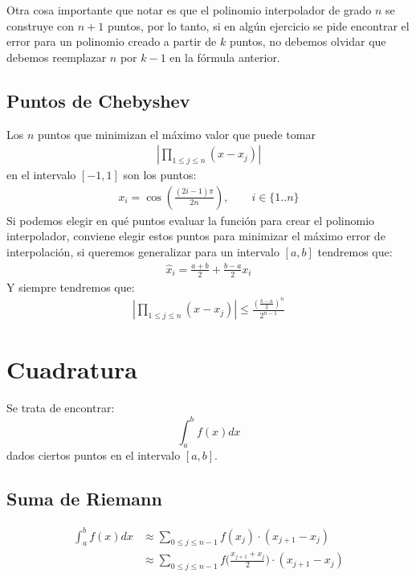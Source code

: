 \documentclass[spanish, fleqn]{article}
\begin{document}
Otra cosa importante que notar es que el polinomio interpolador de grado $n$ se construye con $n+1$ puntos, por lo tanto, si en algún ejercicio se pide encontrar el error para un polinomio creado a partir de $k$ puntos, no debemos olvidar que debemos reemplazar $n$ por $k-1$ en la fórmula anterior.

\subsection{Puntos de Chebyshev}
Los $n$ puntos que minimizan el máximo valor que puede tomar
\begin{align*}
\left| \prod_{1 \leqslant j \leqslant n} (x-x_j) \right|
\end{align*}
en el intervalo $[-1,1]$ son los puntos:
\begin{align*}
x_i = \cos\left(\frac{(2i-1)\pi}{2n}\right), \qquad i \in \{1..n\}
\end{align*}
Si podemos elegir en qué puntos evaluar la función para crear el polinomio interpolador, conviene elegir estos puntos para minimizar el máximo error de interpolación, si queremos generalizar para un intervalo $[a,b]$ tendremos que:
\begin{align*}
\hat{x}_i = \frac{a+b}{2} + \frac{b-a}{2}x_i
\end{align*}
Y siempre tendremos que:
\begin{align*}
\left| \prod_{1 \leqslant j \leqslant n} (x-x_j) \right| \leq \frac{\left(\frac{b-a}{2}\right)^n}{2^{n-1}}
\end{align*}

\section{Cuadratura}

Se trata de encontrar:
\[ \int_a^b f(x) dx \]
dados ciertos puntos en el intervalo $[a, b]$.

\subsection{Suma de Riemann}

\begin{align*} \int_a^b f(x) dx &\approx \sum_{0 \leqslant j \leqslant n-1} f(x_j) \cdot (x_{j+1} - x_j)\\
&\approx \sum_{0 \leqslant j \leqslant n-1} f\Big(\frac{x_{j+1} + x_j}{2}\Big) \cdot (x_{j+1} - x_j)
\end{align*}
\end{document}

